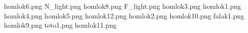 homlok6.png
N_light.png
homlok8.png
F_light.png
homlok3.png
homlok1.png
homlok4.png
homlok5.png
homlok12.png
homlok2.png
homlok10.png
falak1.png
homlok9.png
teto1.png
homlok11.png
